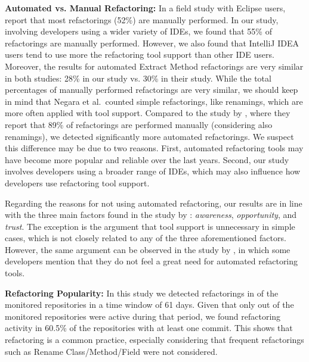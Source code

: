 

\noindent\textbf{Automated vs. Manual Refactoring:} In a field study with Eclipse users, 
\cite{negara2013} report that most refactorings (52\%) are manually performed.
In our study, involving developers using a wider variety of IDEs, we found that 55\% of refactorings are manually performed. 
However, we also found that IntelliJ IDEA users tend to use more the refactoring tool support than other IDE users.
Moreover, the results for automated {\textsc Extract Method} refactorings are very similar in both studies: 28\% in our study vs. 30\% in their study.
While the total percentages of manually performed refactorings are very similar, we should
keep in mind that Negara et al.~counted simple refactorings, like renamings, which are more often applied with tool support.
Compared to the study by \cite{MurphyHill2012},
where they report that 89\% of refactorings are performed manually (considering also renamings),
we detected significantly more automated refactorings.
We suspect this difference may be due to two reasons.
First, automated refactoring tools may have become more popular and reliable
over the last years. Second, our study involves developers using a broader range of IDEs, which may also 
influence how developers use refactoring tool support.

Regarding the reasons for not using automated refactoring, our results are in line with the three main factors found in the study by \cite{MurphyHill2012}: \emph{awareness}, \emph{opportunity}, and \emph{trust}. 
The exception is the argument that tool support is unnecessary in simple cases, which is not closely 
related to any of the three aforementioned factors.
However, the same argument can be observed in the study by \cite{kim-tse-2014}, in which some 
developers mention that they do not feel a great need for automated refactoring tools.\margin

\noindent\textbf{Refactoring Popularity:}
In this study we detected refactorings in  
of the monitored repositories in a time window of 61 days. Given that only \activeProjects out of the \totalProjects monitored 
repositories were active during that period, we found refactoring activity in 60.5\% of the repositories with at least
one commit. This shows that refactoring is a common practice, especially considering that 
frequent refactorings such as {\textsc Rename Class/Method/Field} were not considered.

